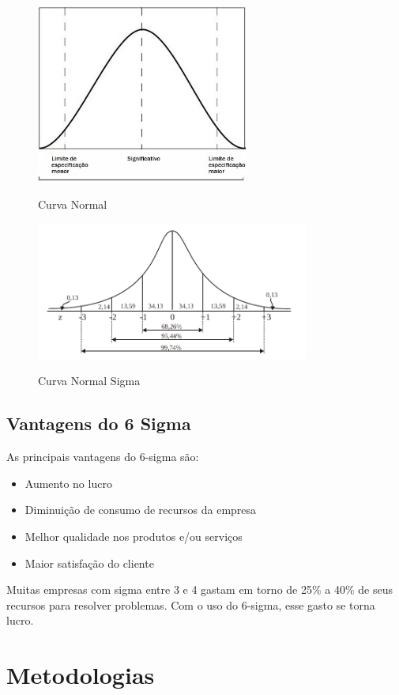 \documentclass{abnt}
\begin{document}
			
			\begin{figure}[h]
				\centering
				\includegraphics[width=7cm, keepaspectratio]{img/curva.jpg}
				\label{fig_curva}
				\caption{Curva Normal}
			\end{figure}
            \begin{figure}[h]
				\centering
				\includegraphics[width=9cm, keepaspectratio]{img/curvasigma.png}
				\label{fig_curva}
				\caption{Curva Normal Sigma}
			\end{figure}
	    

		\section {Vantagens do 6 Sigma}
		
		As principais vantagens do 6-sigma são: 
		\begin{itemize}
			\item {Aumento no lucro}
			\item {Diminuição de consumo de recursos da empresa}
			\item {Melhor qualidade nos produtos e/ou serviços}
			\item {Maior satisfação do cliente}
		\end{itemize}
		
		Muitas empresas com sigma entre 3 e 4 gastam em torno de 25\% a 40\% de seus recursos para resolver problemas. Com o uso do 6-sigma, esse gasto se torna lucro.
		  
				
	\chapter {Metodologias}
\end{document}
